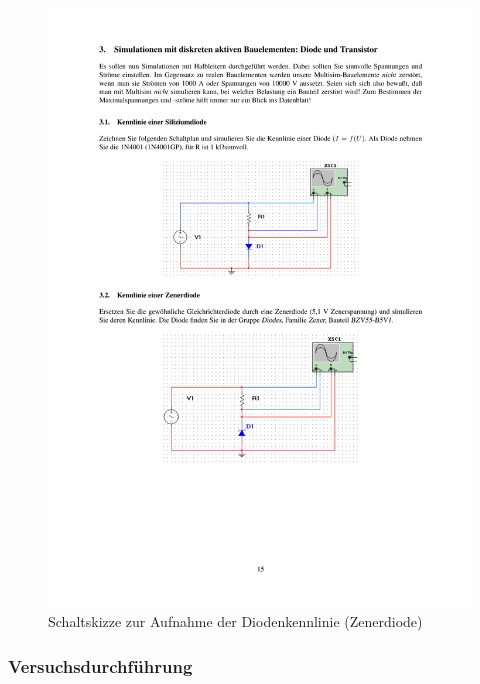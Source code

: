 \documentclass[12pt,a4paper]{article}
\begin{document}
\begin{figure}[H] 
  \centering
    \includegraphics[trim = 10mm 70mm 10mm 165mm, clip, scale = 1]{ep5_14[Page15].pdf}
  	\caption[Schaltskizze zur Aufnahme der Diodenkennlinie (Zenerdiode)]{Schaltskizze zur Aufnahme der Diodenkennlinie (Zenerdiode)\footnotemark}
  \label{fig:1}
\end{figure}

\subsubsection{Versuchsdurchführung}
\end{document}
